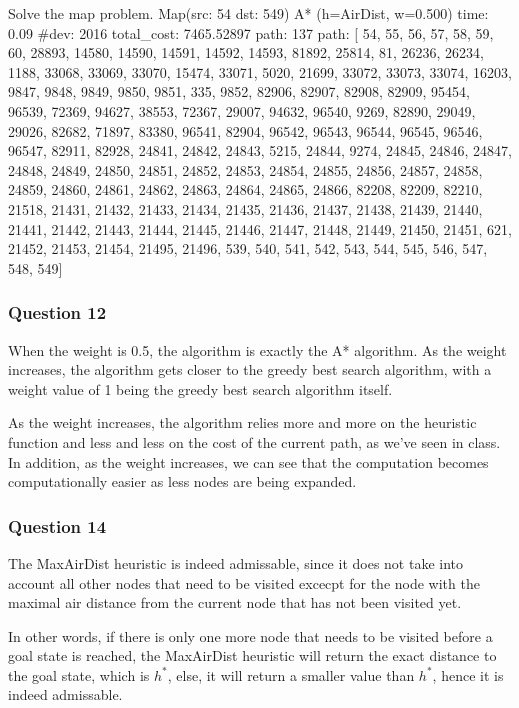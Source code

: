 \documentclass[11pt]{article}
\begin{document}
Solve the map problem. Map(src: 54 dst: 549) A* (h=AirDist, w=0.500)
time: 0.09 \#dev: 2016 total\_cost: 7465.52897 \textbar{}path\textbar{}:
137 path: {[} 54, 55, 56, 57, 58, 59, 60, 28893, 14580, 14590, 14591,
14592, 14593, 81892, 25814, 81, 26236, 26234, 1188, 33068, 33069, 33070,
15474, 33071, 5020, 21699, 33072, 33073, 33074, 16203, 9847, 9848, 9849,
9850, 9851, 335, 9852, 82906, 82907, 82908, 82909, 95454, 96539, 72369,
94627, 38553, 72367, 29007, 94632, 96540, 9269, 82890, 29049, 29026,
82682, 71897, 83380, 96541, 82904, 96542, 96543, 96544, 96545, 96546,
96547, 82911, 82928, 24841, 24842, 24843, 5215, 24844, 9274, 24845,
24846, 24847, 24848, 24849, 24850, 24851, 24852, 24853, 24854, 24855,
24856, 24857, 24858, 24859, 24860, 24861, 24862, 24863, 24864, 24865,
24866, 82208, 82209, 82210, 21518, 21431, 21432, 21433, 21434, 21435,
21436, 21437, 21438, 21439, 21440, 21441, 21442, 21443, 21444, 21445,
21446, 21447, 21448, 21449, 21450, 21451, 621, 21452, 21453, 21454,
21495, 21496, 539, 540, 541, 542, 543, 544, 545, 546, 547, 548, 549{]}

    \subsubsection{Question 12}\label{question-12}

When the weight is 0.5, the algorithm is exactly the A* algorithm. As
the weight increases, the algorithm gets closer to the greedy best
search algorithm, with a weight value of 1 being the greedy best search
algorithm itself.

As the weight increases, the algorithm relies more and more on the
heuristic function and less and less on the cost of the current path, as
we've seen in class. In addition, as the weight increases, we can see
that the computation becomes computationally easier as less nodes are
being expanded. 

    \subsubsection{Question 14}\label{question-14}

The MaxAirDist heuristic is indeed admissable, since it does not take
into account all other nodes that need to be visited excecpt for the
node with the maximal air distance from the current node that has not
been visited yet.

In other words, if there is only one more node that needs to be visited
before a goal state is reached, the MaxAirDist heuristic will return the
exact distance to the goal state, which is \(h^{*}\), else, it will
return a smaller value than \(h^{*}\), hence it is indeed admissable.
\end{document}
